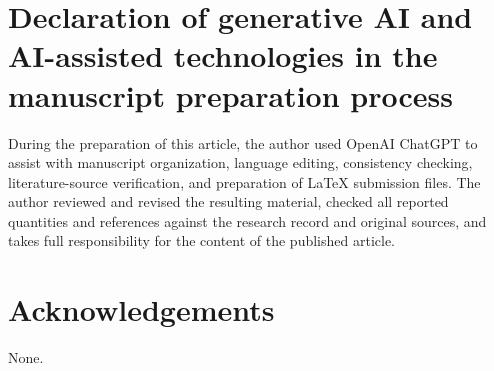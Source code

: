\documentclass[a4paper,fleqn]{cas-sc}
\begin{document}
\section*{Declaration of generative AI and AI-assisted technologies in the manuscript preparation process}
During the preparation of this article, the author used OpenAI ChatGPT to assist with manuscript organization, language editing, consistency checking, literature-source verification, and preparation of LaTeX submission files. The author reviewed and revised the resulting material, checked all reported quantities and references against the research record and original sources, and takes full responsibility for the content of the published article.

\section*{Acknowledgements}
None.



\end{document}
